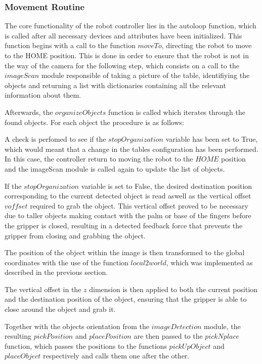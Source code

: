 \subsubsection{Movement Routine}

The core functionality of the robot controller lies in the autoloop function, which is called after all necessary devices and attributes have been initialized. This function begins with a call to the function \(moveTo\), directing the robot to move to the HOME position.  This is done in order to ensure that the robot is not in the way of the camera for the following step, which consists on a call to the \(imageScan\) module responsible of taking a picture of the table, identifiying the objects and returning a list with dictionaries containing all the relevant information about them.

Afterwards, the \(organizeObjects\) function is called which iterates through the found objects. For each object the procedure is as follows: 

A check is perfomed to see if the \(stopOrganization\) variable has been set to True, which would meant that a change in the tables configuration has been performed. In this case, the controller return to moving the robot to the \(HOME\) position and the imageScan module is called again to update the list of objects. 

If the \(stopOrganization\) variable is set to False, the desired destination position corresponding to the current detected object is read aswell as the vertical offset \(voffset\) required to grab the object. This vertical offset proved to be necessary due to taller objects making contact with the palm or base of the fingers before the gripper is closed, resulting in a detected feedback force that prevents the gripper from closing and grabbing the object. 

The position of the object within the image is then transformed to the global coordinates with the use of the function \(local2world\), which was implemented as described in the previous section.

The vertical offset in the \(z\) dimension is then  applied to both the current position and the destination position of the object, ensuring that the gripper is able to close around the object and grab it. 

Together with the objects orientation from the \(image Detection\) module, the resulting \(pickPosition\) and \(placePosition\) are then passed  to the \(pickNplace\) function,  which passes the positions to the functions \(pickUpObject\) and \(placeObject\) respectively and calls them one after the other.


